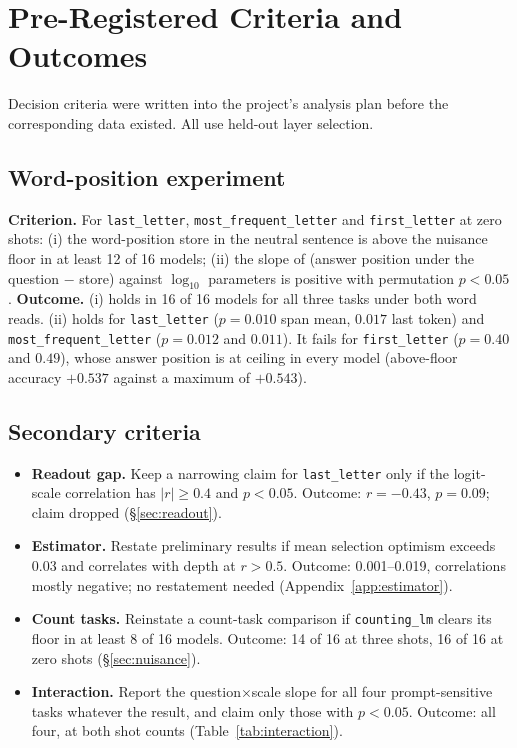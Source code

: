 \section{Pre-Registered Criteria and Outcomes}
\label{app:prereg}

Decision criteria were written into the project's analysis plan before the corresponding data
existed. All use held-out layer selection.

\subsection{Word-position experiment}
\label{app:prereg_e1}
\textbf{Criterion.} For \texttt{last\_letter}, \texttt{most\_frequent\_letter} and
\texttt{first\_letter} at zero shots: (i) the word-position store in the neutral sentence is above the
nuisance floor in at least 12 of 16 models; (ii) the slope of (answer position under the question
$-$ store) against $\log_{10}$ parameters is positive with permutation $p < 0.05$.
\textbf{Outcome.} (i) holds in 16 of 16 models for all three tasks under both word reads. (ii) holds
for \texttt{last\_letter} ($p = 0.010$ span mean, $0.017$ last token) and
\texttt{most\_frequent\_letter} ($p = 0.012$ and $0.011$). It fails for \texttt{first\_letter}
($p = 0.40$ and $0.49$), whose answer position is at ceiling in every model (above-floor accuracy
$+0.537$ against a maximum of $+0.543$).

\subsection{Secondary criteria}
\begin{itemize}
  \item \textbf{Readout gap.} Keep a narrowing claim for \texttt{last\_letter} only if the logit-scale
    correlation has $|r| \geq 0.4$ and $p < 0.05$. Outcome: $r = -0.43$, $p = 0.09$; claim dropped
    (\S\ref{sec:readout}).
  \item \textbf{Estimator.} Restate preliminary results if mean selection optimism exceeds 0.03 and
    correlates with depth at $r > 0.5$. Outcome: 0.001--0.019, correlations mostly negative; no
    restatement needed (Appendix~\ref{app:estimator}).
  \item \textbf{Count tasks.} Reinstate a count-task comparison if \texttt{counting\_lm} clears its
    floor in at least 8 of 16 models. Outcome: 14 of 16 at three shots, 16 of 16 at zero shots
    (\S\ref{sec:nuisance}).
  \item \textbf{Interaction.} Report the question$\times$scale slope for all four prompt-sensitive
    tasks whatever the result, and claim only those with $p < 0.05$. Outcome: all four, at both
    shot counts (Table~\ref{tab:interaction}).
\end{itemize}

